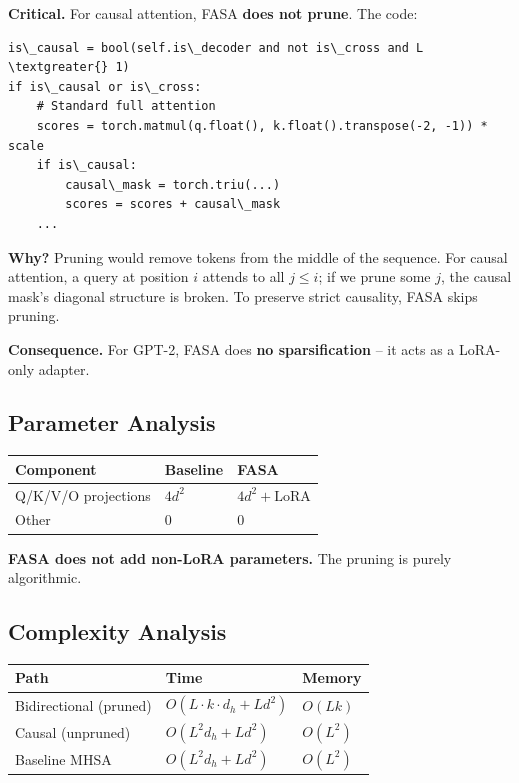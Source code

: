 \textbf{Critical.} For causal attention, FASA \textbf{does not prune}. The code:

\begin{lstlisting}
is\_causal = bool(self.is\_decoder and not is\_cross and L \textgreater{} 1)
if is\_causal or is\_cross:
    # Standard full attention
    scores = torch.matmul(q.float(), k.float().transpose(-2, -1)) * scale
    if is\_causal:
        causal\_mask = torch.triu(...)
        scores = scores + causal\_mask
    ...
\end{lstlisting}

\textbf{Why?} Pruning would remove tokens from the middle of the sequence. For 
causal attention, a query at position $i$ attends to all $j \leq i$; if we 
prune some $j$, the causal mask's diagonal structure is broken. To preserve 
strict causality, FASA skips pruning.

\textbf{Consequence.} For GPT-2, FASA does \textbf{no sparsification} -- it acts as a 
LoRA-only adapter.

\subsection{Parameter Analysis}

\begin{table}[H]
\centering
\small
\begin{tabular}{lll}
\toprule
\textbf{Component} & \textbf{Baseline} & \textbf{FASA} \\
\midrule
Q/K/V/O projections & $4d^2$ & $4d^2 + \text{LoRA}$ \\
Other & 0 & 0 \\
\bottomrule
\end{tabular}
\end{table}

\textbf{FASA does not add non-LoRA parameters.} The pruning is purely 
algorithmic.

\subsection{Complexity Analysis}

\begin{table}[H]
\centering
\small
\begin{tabular}{lll}
\toprule
\textbf{Path} & \textbf{Time} & \textbf{Memory} \\
\midrule
Bidirectional (pruned) & $O(L \cdot k \cdot d_h + L d^2)$ & $O(L k)$ \\
Causal (unpruned) & $O(L^2 d_h + L d^2)$ & $O(L^2)$ \\
Baseline MHSA & $O(L^2 d_h + L d^2)$ & $O(L^2)$ \\
\bottomrule
\end{tabular}
\end{table}

